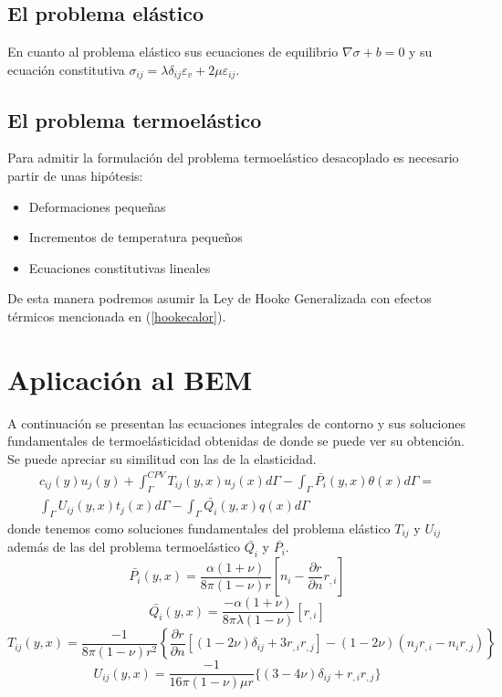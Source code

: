 \documentclass[11pt,a4paper]{article}
\begin{document}
\subsection{El problema elástico}
En cuanto al problema elástico sus ecuaciones de equilibrio $\nabla \sigma +b =0$ y su ecuación constitutiva $\sigma_{ij}=\lambda \delta_{ij} \varepsilon_{v} + 2 \mu \varepsilon_{ij}$.
\subsection{El problema termoelástico}
Para admitir la formulación del problema termoelástico desacoplado es necesario partir de unas hipótesis: \begin{itemize}
\item Deformaciones pequeñas
\item Incrementos de temperatura pequeños
\item Ecuaciones constitutivas lineales
\end{itemize}
De esta manera podremos asumir la Ley de Hooke Generalizada con efectos térmicos mencionada en (\ref{hookecalor}).
\section{Aplicación al BEM}
A continuación se presentan las ecuaciones integrales de contorno y sus soluciones fundamentales de termoelásticidad obtenidas de \cite{Bal} donde se puede ver su obtención. Se puede apreciar su similitud con las de la elasticidad.
\begin{equation}
\begin{aligned}
c_{ij}(y)u_{j}(y)+\int_{\Gamma}^{CPV} T_{ij}(y,x)u_{j}(x) d \Gamma - \int_{\Gamma} \bar{P_{i}}(y,x)\theta(x) d\Gamma = \\ \int_{\Gamma} U_{ij}(y,x)t_{j}(x) d\Gamma -\int_{\Gamma} \bar{Q_{i}}(y,x)q(x)d\Gamma
\end{aligned}
\end{equation}
donde tenemos como soluciones fundamentales del problema elástico $T_{ij}$ y $U_{ij}$ además de las del problema termoelástico $\bar{Q_{i}}$ y $ \bar{P_{i}}$.
\vspace{0.5cm}
\begin{equation}
\bar{P_{i}}(y,x)=\frac{\alpha(1+\nu)}{8\pi(1-\nu)r}[n_i-\frac{\partial{r}}{\partial{n}}r_{,i}]
\end{equation}
\begin{equation}
\bar{Q_{i}}(y,x)=\frac{-\alpha(1+\nu)}{8\pi\lambda(1-\nu)}[r_{,i}]
\end{equation}
\begin{equation}
T_{ij}(y,x)=\frac{-1}{8\pi(1-\nu)r^2} \left\{\frac{\partial{r}}{\partial{n}}[(1-2\nu)\delta_{ij}+3r_{,i}r_{,j}]-(1-2\nu)(n_j r_{,i}-n_i r_{,j}) \right\}
\end{equation}
\begin{equation}
U_{ij}(y,x)=\frac{-1}{16\pi(1-\nu)\mu r} \{ (3-4\nu) \delta_{ij} + r_{,i} r_{,j}\}
\end{equation}
\end{document}

